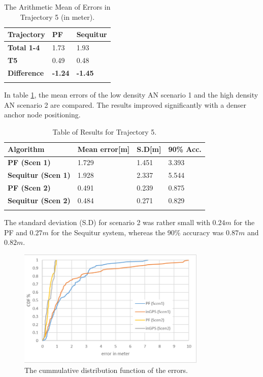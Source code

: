 \begin{table}
\caption{The Arithmetic Mean of Errors in Trajectory 5 (in meter).}
\label{tab:arithmetic_errors_trajectory5}
\centering
\begin{tabular}{l l l}
\toprule
\textbf{Trajectory} & \textbf{PF} & \textbf{Sequitur}\\
\midrule
\textbf{Total 1-4} & 1.73 & 1.93\\
\textbf{T5} & 0.49 & 0.48\\
\midrule
\textbf{Difference}  & \textbf{-1.24} & \textbf{-1.45}\\
\bottomrule\\
\end{tabular}
\end{table}
In table \ref{tab:arithmetic_errors_trajectory5}, the mean errors of the low density AN scenario 1 and the high density AN scenario 2 are compared. The results improved significantly with a denser anchor node positioning. 
\begin{table}
\caption{Table of Results for Trajectory 5.}
\label{tab:results_trajectory5}
\centering
\begin{tabular}{l l l l}
\toprule
\textbf{Algorithm} & \textbf{Mean error}[m] & \textbf{S.D}[m] & \textbf{90\% Acc.}\\
\midrule
\textbf{PF (Scen 1)} & 1.729 & 1.451 & 3.393\\
\textbf{Sequitur (Scen 1)} & 1.928 & 2.337 & 5.544\\
\midrule
\textbf{PF (Scen 2)} & 0.491 & 0.239 & 0.875\\
\textbf{Sequitur (Scen 2)} & 0.484 & 0.271 & 0.829\\
\bottomrule\\
\end{tabular}
\end{table}
The standard deviation (S.D) for scenario 2 was rather small with $0.24m$ for the PF and $0.27m$ for the Sequitur system, whereas the 90\% accuracy was $0.87m$ and $0.82m$. 
\begin{figure}[th]
\centering
\includegraphics[width=0.8\textwidth]{Figures/cdf_all}
\decoRule
\caption[CDF Scenario 1 and 2]{The cummulative distribution function of the errors.}
\label{fig:cdf_all}
\end{figure}

